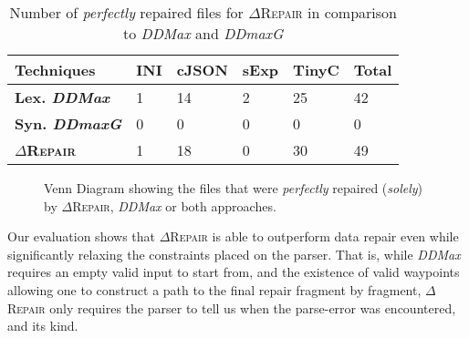 \documentclass[acmsmall,screen,review,anonymous]{acmart}
\newcounter{todocounter}
\newcommand{\todo}[1]{\marginpar{$|$}\textcolor{red}{\stepcounter{todocounter}\footnote[\thetodocounter]{\textcolor{red}{\textbf{TODO }}\textit{#1}}}}
\renewcommand{\todo}[1]{}
\newcommand{\dtask}{data repair\xspace}
\newcommand{\approach}{\textsc{$\Delta$Repair}\xspace}
\newcommand{\ddmax}{\textit{DDMax}\xspace}
\newcommand{\ddmaxg}{\textit{DDmaxG}\xspace}
\newcommand{\drepair}{\approach}
\begin{document}
\begin{table}[!tbp]\centering
\caption{Number of \textit{perfectly} repaired files for \approach in comparison to \ddmax and \ddmaxg
}
\begin{tabular}{|p{4.0cm}|p{1.5cm}|p{1.5cm}|p{1.5cm}|p{1.5cm}|p{1.5cm}|}
\hline
\textbf{Techniques}&  \textbf{INI}&\textbf{cJSON} &\textbf{sExp}&\textbf{TinyC}&\textbf{Total}  \\
\hline
\textbf{Lex. \ddmax}  & 1 & 14 & 2 & 25 & 42 \\
\textbf{Syn. \ddmaxg} & 0 & 0  & 0 & 0  & 0  \\
\hline
\textbf{\approach} &  1 & 18  & 0 & 30 & 49  \\
\hline
\end{tabular}
\label{tab:perfectrepairs}
\end{table}

\begin{figure}[!tbp]\centering
\caption{\centering Venn Diagram showing the 
files that were \textit{perfectly} repaired (\textit{solely}) by \approach,  \ddmax or both approaches. 
}
\centering
\begin{minipage}[b]{0.45\textwidth}
    \centering
\end{minipage}
\vspace{-0.4cm}
\label{fig:perfectlyrepairedvenndiagram}
\end{figure}

Our evaluation shows that \drepair is able to outperform 
\dtask even while significantly relaxing the constraints placed on the parser.
That is, while \ddmax requires an empty valid input to start from, and the
existence of valid waypoints allowing one to construct a path to the final
repair fragment by fragment, \drepair only requires the parser to tell us when
the parse-error was encountered, and its kind.
\end{document}
